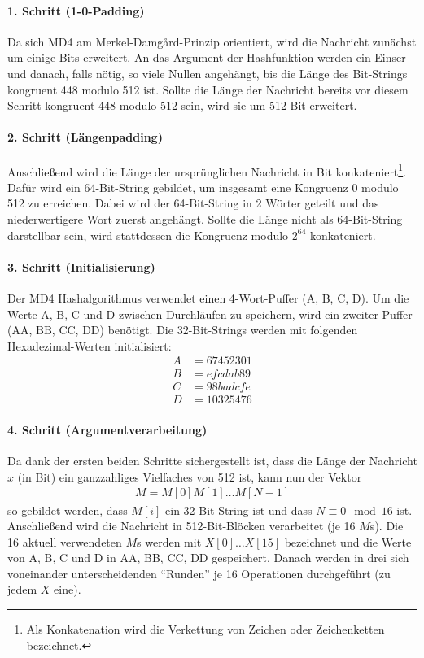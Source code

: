 \documentclass[12pt,a4paper]{scrartcl}
\numberwithin{equation}{section}
\numberwithin{myalgctr}{section}
\numberwithin{mytheoremctr}{section}
\newcommand{\mpar}[1]{\paragraph*{#1}\mbox{}\par}
\begin{document}
	
	
	\mpar{1. Schritt (1-0-Padding)}\noindent
	Da sich MD4 am Merkel-Damg\aa rd-Prinzip orientiert, wird die Nachricht zunächst um einige Bits erweitert. An das Argument der Hashfunktion werden ein Einser und danach, falls nötig, so viele Nullen angehängt, bis die Länge des Bit-Strings kongruent 448 modulo 512 ist. Sollte die Länge der Nachricht bereits vor diesem Schritt kongruent 448 modulo 512 sein, wird sie um 512 Bit erweitert.\autocite[vgl.][20]{md4Familie}
	
	\mpar{2. Schritt (Längenpadding)}\noindent
	Anschließend wird die Länge der ursprünglichen Nachricht in Bit konkateniert\footnote{Als Konkatenation wird die Verkettung von Zeichen oder Zeichenketten bezeichnet.}. Dafür wird ein 64-Bit-String gebildet, um insgesamt eine Kongruenz 0 modulo 512 zu erreichen. Dabei wird der 64-Bit-String in 2 Wörter geteilt und das niederwertigere Wort zuerst angehängt. Sollte die Länge nicht als 64-Bit-String darstellbar sein, wird stattdessen die Kongruenz modulo $2^{64}$ konkateniert.\autocite[vgl.][21]{md4Familie}
	
	\mpar{3. Schritt (Initialisierung)}\noindent
	Der MD4 Hashalgorithmus verwendet einen 4-Wort-Puffer (A, B, C, D). Um die Werte A, B, C und D zwischen Durchläufen zu speichern, wird ein zweiter Puffer (AA, BB, CC, DD) benötigt. Die 32-Bit-Strings werden mit folgenden Hexadezimal-Werten initialisiert: \autocite[vgl.][S. 247~f.]{cryptography}
	\begin{align*}
		A &= 67452301\\
		B &= efcdab89\\
		C &= 98badcfe\\
		D &= 10325476
	\end{align*}

	\mpar{4. Schritt (Argumentverarbeitung)}\noindent
	Da dank der ersten beiden Schritte sichergestellt ist, dass die Länge der Nachricht $x$ (in Bit) ein ganzzahliges Vielfaches von 512 ist, kann nun der Vektor 
	\begin{align*}
		M = M[0]M[1]\dots M[N - 1]
	\end{align*}
	so gebildet werden, dass $M[i]$ ein 32-Bit-String ist und dass $N\equiv 0\mod 16$ ist.
	Anschließend wird die Nachricht in 512-Bit-Blöcken verarbeitet (je 16 $M$s). Die 16 aktuell verwendeten $M$s werden mit $X[0]\dots X[15]$ bezeichnet und die Werte von A, B, C und D in AA, BB, CC, DD gespeichert. Danach werden in drei sich voneinander unterscheidenden \textquotedblleft Runden\textquotedblright{} je 16 Operationen durchgeführt (zu jedem $X$ eine).\autocite[vgl.][S. 247~f.]{cryptography}\\
\end{document}
